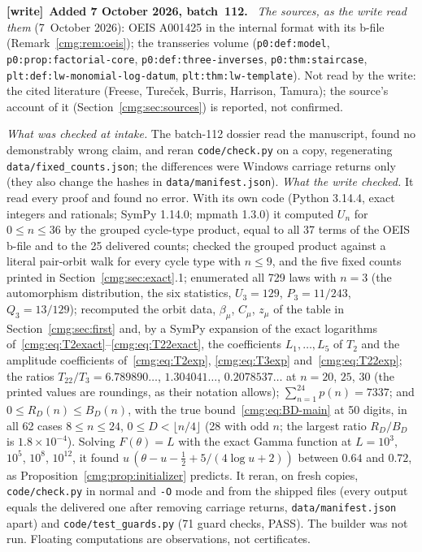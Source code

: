 \documentclass[11pt,letterpaper]{article}
\numberwithin{equation}{section}
\theoremstyle{definition}\newtheorem{definition}[theorem]{Definition}
\theoremstyle{remark}\newtheorem{remark}[theorem]{Remark}
\newcommand{\file}[1]{\nolinkurl{#1}}
\newenvironment{writenote}[1][]{\par\smallskip\begingroup\small
 \noindent\textbf{[write]}\if\relax\detokenize{#1}\relax\else~\textbf{#1.}\fi\ }%
 {\par\endgroup\smallskip}
\begin{document}
\begin{writenote}[Added 7 October 2026, batch~112]
\emph{The sources, as the write read them} (7~October 2026): OEIS A001425 in
the internal format with its b-file (Remark~\ref{cmg:rem:oeis}); the
transseries volume
(\file{p0:def:model}, \file{p0:prop:factorial-core}, \file{p0:def:three-inverses},
\file{p0:thm:staircase}, \file{plt:def:lw-monomial-log-datum},
\file{plt:thm:lw-template}). Not read by the write: the cited literature
(Freese, Ture\v{c}ek, Burris, Harrison, Tamura); the source's account of it
(Section~\ref{cmg:sec:sources}) is reported, not confirmed.

\emph{What was checked at intake.} The batch-112 dossier read the manuscript,
found no demonstrably wrong claim, and reran \file{code/check.py} on a copy,
regenerating \file{data/fixed_counts.json}; the differences were Windows
carriage returns only (they also change the hashes in \file{data/manifest.json}).
\emph{What the write checked.} It read every proof and found no error. With
its own code (Python 3.14.4, exact integers and rationals; SymPy 1.14.0;
mpmath 1.3.0) it computed $U_n$ for $0\le n\le36$ by the grouped cycle-type
product, equal to all 37 terms of the OEIS b-file and to the 25 delivered
counts; checked the grouped product against a literal pair-orbit walk for
every cycle type with $n\le9$, and the five fixed counts printed in
Section~\ref{cmg:sec:exact}.1; enumerated all 729 laws with $n=3$ (the
automorphism distribution, the six statistics, $U_3=129$, $P_3=11/243$,
$Q_3=13/129$); recomputed the orbit data, $\beta_\mu$, $C_\mu$, $z_\mu$ of the
table in Section~\ref{cmg:sec:first} and, by a SymPy expansion of the exact
logarithms of~\eqref{cmg:eq:T2exact}--\eqref{cmg:eq:T22exact}, the
coefficients $L_1,\ldots,L_5$ of $T_2$ and the amplitude coefficients
of~\eqref{cmg:eq:T2exp}, \eqref{cmg:eq:T3exp} and~\eqref{cmg:eq:T22exp}; the
ratios $T_{22}/T_3=6.789890\ldots$, $1.304041\ldots$, $0.2078537\ldots$ at
$n=20$, $25$, $30$ (the printed values are roundings, as their notation
allows); $\sum_{n=1}^{24}p(n)=7337$; and $0\le R_D(n)\le B_D(n)$, with the true
bound~\eqref{cmg:eq:BD-main} at 50 digits, in all 62 cases $8\le n\le24$,
$0\le D<\lfloor n/4\rfloor$ (28 with odd $n$; the largest ratio
$R_D/B_D$ is $1.8\times10^{-4}$). Solving $F(\theta)=L$ with the exact Gamma
function at $L=10^3$, $10^5$, $10^8$, $10^{12}$, it found
$u\,(\theta-u-\frac12+5/(4\log u+2))$ between $0.64$ and $0.72$, as
Proposition~\ref{cmg:prop:initializer} predicts. It reran, on fresh copies,
\file{code/check.py} in normal and \texttt{-O} mode and from the shipped files
(every output equals the delivered one after removing carriage returns,
\file{data/manifest.json} apart) and \file{code/test_guards.py} (71 guard
checks, PASS). The builder was not run. Floating computations are
observations, not certificates.


\end{writenote}
\end{document}
